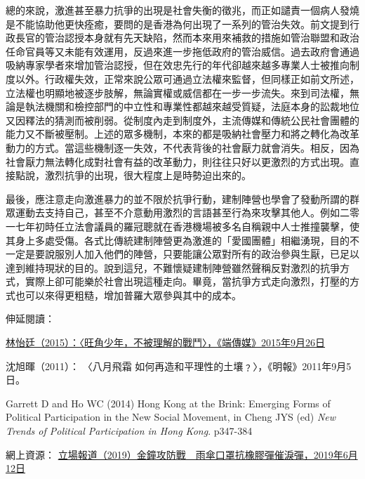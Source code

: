 總的來說，激進甚至暴力抗爭的出現是社會失衡的徵兆，而正如譴責一個病人發燒是不能協助他更快痊癒，要問的是香港為何出現了一系列的管治失效。前文提到行政長官的管治認授本身就有先天缺陷，然而本來用來補救的措施如管治聯盟和政治任命官員等又未能有效運用，反過來進一步拖低政府的管治威信。過去政府會通過吸納專家學者來增加管治認授，但在效忠先行的年代卻越來越多專業人士被推向制度以外。行政權失效，正常來說公眾可通過立法權來監督，但同樣正如前文所述，立法權也明顯地被逐步肢解，無論實權或威信都在一步一步流失。來到司法權，無論是執法機關和檢控部門的中立性和專業性都越來越受質疑，法庭本身的訟裁地位又因釋法的猜測而被削弱。從制度內走到制度外，主流傳媒和傳統公民社會團體的能力又不斷被壓制。上述的眾多機制，本來的都是吸納社會壓力和將之轉化為改革動力的方式。當這些機制逐一失效，不代表背後的社會厭力就會消失。相反，因為社會厭力無法轉化成對社會有益的改革動力，則往往只好以更激烈的方式出現。直接點說，激烈抗爭的出現，很大程度上是時勢迫出來的。

最後，應注意走向激進暴力的並不限於抗爭行動，建制陣營也學會了發動所謂的群眾運動去支持自己，甚至不介意動用激烈的言語甚至行為來攻擊其他人。例如二零一七年初時任立法會議員的羅冠聰就在香港機場被多名自稱親中人士推撞襲擊，使其身上多處受傷。各式比傳統建制陣營更為激進的「愛國團體」相繼湧現，目的不一定是要說服別人加入他們的陣營，只要能讓公眾對所有的政治參與生厭，已足以達到維持現狀的目的。說到這兒，不難懷疑建制陣營雖然聲稱反對激烈的抗爭方式，實際上卻可能樂於社會出現這種走向。畢竟，當抗爭方式走向激烈，打壓的方式也可以來得更粗糙，增加普羅大眾參與其中的成本。

伸延閱讀：

\href{https://theinitium.com/article/20150921-hongkong-occupycentraloneyear02/}{林怡廷（2015）：〈旺角少年，不被理解的戰鬥〉，《端傳媒》2015年9月26日}

沈旭暉（2011）： 〈八月飛霜 如何再造和平理性的土壤﹖〉，《明報》2011年9月5日。

Garrett D and Ho WC (2014) Hong Kong at the Brink: Emerging Forms of Political Participation in the New Social Movement, in Cheng JYS (ed) \textit{New Trends of Political Participation in Hong Kong}. p347-384

網上資源：
\href{http://thestand.news/politics/6-12-佔領-圖輯二-金鐘攻防戰-雨傘口罩抗橡膠彈催淚彈/}{立場報道（2019）金鐘攻防戰　雨傘口罩抗橡膠彈催淚彈，2019年6月12日}